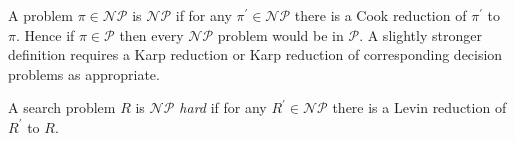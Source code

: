 \documentclass[12pt]{article}
\begin{document}
A problem $\pi\in\mathcal{NP}$ is $\mathcal{NP}$ \emph{} if for any $\pi^\prime\in\mathcal{NP}$ there is a Cook reduction of $\pi^\prime$ to $\pi$.  Hence if $\pi\in\mathcal{P}$ then every $\mathcal{NP}$ problem would be in $\mathcal{P}$.  A slightly stronger definition requires a Karp reduction or Karp reduction of corresponding decision problems as appropriate.

A search problem $R$ is \emph{$\mathcal{NP}$ hard} if for any $R^\prime\in\mathcal{NP}$ there is a Levin reduction of $R^\prime$ to $R$.
\end{document}
